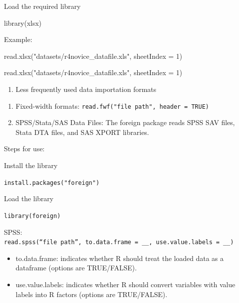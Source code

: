 \documentclass[
  letterpaper,
  DIV=11,
  numbers=noendperiod]{scrreprt}
\newenvironment{Shaded}{}{}
\newcommand{\AttributeTok}[1]{\textcolor[rgb]{0.84,0.23,0.29}{#1}}
\newcommand{\DecValTok}[1]{\textcolor[rgb]{0.00,0.36,0.77}{#1}}
\newcommand{\FunctionTok}[1]{\textcolor[rgb]{0.44,0.26,0.76}{#1}}
\newcommand{\NormalTok}[1]{\textcolor[rgb]{0.14,0.16,0.18}{#1}}
\newcommand{\StringTok}[1]{\textcolor[rgb]{0.01,0.18,0.38}{#1}}
\providecommand{\tightlist}{%
  \setlength{\itemsep}{0pt}\setlength{\parskip}{0pt}}\usepackage{longtable,booktabs,array}
\begin{document}
Load the required library

\begin{Shaded}
\begin{Highlighting}[]
\FunctionTok{library}\NormalTok{(xlsx)}
\end{Highlighting}
\end{Shaded}

Example:

\begin{Shaded}
\begin{Highlighting}[]
\FunctionTok{read.xlsx}\NormalTok{(}\StringTok{"datasets/r4novice\_datafile.xls"}\NormalTok{, }\AttributeTok{sheetIndex =} \DecValTok{1}\NormalTok{)}
\end{Highlighting}
\end{Shaded}

\begin{Shaded}
\begin{Highlighting}[]
\FunctionTok{read.xlsx}\NormalTok{(}\StringTok{"datasets/r4novice\_datafile.xls"}\NormalTok{, }\AttributeTok{sheetIndex =} \DecValTok{1}\NormalTok{)}
\end{Highlighting}
\end{Shaded}

\begin{enumerate}
\def\labelenumi{\arabic{enumi}.}
\setcounter{enumi}{1}
\tightlist
\item
  Less frequently used data importation formats
\end{enumerate}

\begin{enumerate}
\def\labelenumi{\alph{enumi}.}
\item
  Fixed-width formats: \texttt{read.fwf("file\ path",\ header\ =\ TRUE)}
\item
  SPSS/Stata/SAS Data Files: The foreign package reads SPSS SAV files,
  Stata DTA files, and SAS XPORT libraries.
\end{enumerate}

Steps for use:

Install the library

\texttt{install.packages("foreign")}

Load the library

\texttt{library(foreign)}

SPSS:
\texttt{read.spss(“file\ path”,\ to.data.frame\ =\ \_\_,\ use.value.labels\ =\ \_\_)}

\begin{itemize}
\item
  to.data.frame: indicates whether R should treat the loaded data as a
  dataframe (options are TRUE/FALSE).
\item
  use.value.labels: indicates whether R should convert variables with
  value labels into R factors (options are TRUE/FALSE).
\end{itemize}
\end{document}
